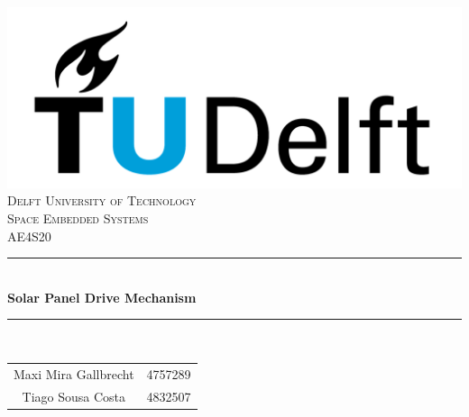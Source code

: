 \documentclass[11pt]{article}
\begin{document}
\begin{titlepage}
\newcommand{\HRule}{\rule{\linewidth}{0.5mm}} %

\center 
\setlength{\headheight}{15pt}
\includegraphics[scale=0.45]{TU-delft.png}\\[1.5cm] 

\textsc{\LARGE Delft University of Technology}\\[2cm]
\textsc{\Large Space Embedded Systems\\ AE4S20 }\\[1cm] 

\HRule \\[0.2cm]
{\huge \bfseries Solar Panel Drive Mechanism\\[0.4cm]} %
\HRule \\[0.1cm]
\vfill
\begin{table}[H]
    \centering
    \begin{tabular}{cc}
 Maxi Mira Gallbrecht & 4757289 \\
 Tiago Sousa Costa &  4832507
    \end{tabular}
\end{table}
\end{titlepage}
\setlength{\headheight}{52pt}
\pagebreak

	\setcounter{page}{1}
	\pagebreak
	\tableofcontents
	\cleardoublepage
	\pagebreak
	\pagestyle{fancy}



\pagebreak

\pagebreak

\pagebreak

\pagebreak

\pagebreak

\pagebreak

\pagebreak

\pagebreak

\pagebreak
\end{document}
